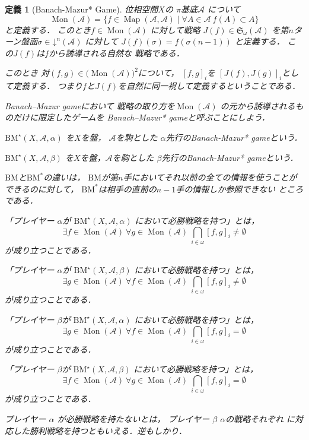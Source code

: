 \documentclass[leqno, 12pt]{jsarticle}
\newtheorem{df}[thm]{定義}
\DeclareMathOperator{\map}{Map}
\DeclareMathOperator{\mon}{Mon}
\newcommand{\mycal}[1]{\mathcal{#1}}
\newcommand{\mydn}[2]{\mathord{\downarrow}^{#1}(#2)}
\newcommand{\mysen}[2]{\mathfrak{S}_{#1}(#2)}
\newcommand{\myka}[3]{[#1, #2]_{#3}}
\newcommand{\mybmb}[3]{\mathrm{BM}^{\star}(#1, #2, #3)}
\newcommand{\myom}{\omega}
\begin{document}
\begin{df}[Banach-Mazur* Game]
位相空間$X$の
$\pi$基底$\mycal{A}$
について
\[
\mon(\mycal{A})=
\{f\in \map(\mycal{A}, \mycal{A})\mid 
\forall A\in \mycal{A}\ f(A)\subset A\}
\]
と定義する．
このとき$f\in \mon(\mycal{A})$
に対して戦略
$J(f)\in \mysen{\myom}{\mycal{A}}$
を第$n$ターン盤面$\sigma\in \mydn{n}{\mycal{A}}$
に対して
$J(f)(\sigma)=f(\sigma(n-1))$
と定義する．
この$J(f)$は$f$から誘導される自然な
戦略である．

このとき
対$(f, g)\in \bigl(\mon(\mathcal{A})\bigr)^{2}$について，
$\myka{f}{g}{i}$を
$\myka{J(f)}{J(g)}{i}$として定義する．
つまり$f$と$J(f)$を自然に同一視して定義するということである．

Banach--Mazur gameにおいて
戦略の取り方を$\mon(\mycal{A})$
の元から誘導されるものだけに限定したゲームを
Banach--Mazur* gameと呼ぶことにしよう．

$\mybmb{X}{\mycal{A}}{\alpha}$
を$X$を盤，
$\mathcal{A}$を駒とした
$\alpha$先行のBanach-Mazur* gameという．

$\mybmb{X}{\mycal{A}}{\beta}$
を$X$を盤，$\mathcal{A}$を駒とした
$\beta$先行のBanach-Mazur* gameという．

$\mathrm{BM}$と$\mathrm{BM^{*}}$の違いは，
$\mathrm{BM}$が第$n$手においてそれ以前の全ての情報を使うことができるのに対して，
$\mathrm{BM^{*}}$は相手の直前の$n-1$手の情報しか参照できない
ところである．


「プレイヤー
$\alpha$が
$\mybmb{X}{\mycal{A}}{\alpha}$
において必勝戦略を持つ」とは，
\[
\exists f\in  \mon(\mycal{A})\ \forall g\in  \mon(\mycal{A})\ 
\bigcap_{i\in \myom}
\myka{f}{g}{i}\neq 
\emptyset
\]
が成り立つことである．

「プレイヤー
$\alpha$が
$\mybmb{X}{\mycal{A}}{\beta}$
において必勝戦略を持つ」とは，
\[
\exists g\in  \mon(\mycal{A})\ \forall f\in  \mon(\mycal{A})\ 
\bigcap_{i\in \myom}
\myka{f}{g}{i}\neq
\emptyset
\]
が成り立つことである．

「プレイヤー
$\beta$が
$\mybmb{X}{\mycal{A}}{\alpha}$
において必勝戦略を持つ」とは，
\[
\exists g\in  \mon(\mycal{A})\ \forall f\in  \mon(\mycal{A})\ 
\bigcap_{i\in \myom}
\myka{f}{g}{i}=
\emptyset
\]
が成り立つことである．

「プレイヤー
$\beta$が
$\mybmb{X}{\mycal{A}}{\beta}$
において必勝戦略を持つ」とは，
\[
\exists f\in  \mon(\mycal{A})\ \forall g\in  \mon(\mycal{A})\ 
\bigcap_{i\in \myom}
\myka{f}{g}{i}
=\emptyset
\]
が成り立つことである．

プレイヤー
$\alpha$
が必勝戦略を持たないとは，
プレイヤー
$\beta$
$\alpha$の戦略それぞれ
に対応した勝利戦略を持つともいえる．逆もしかり．
\end{df}
\end{document}
